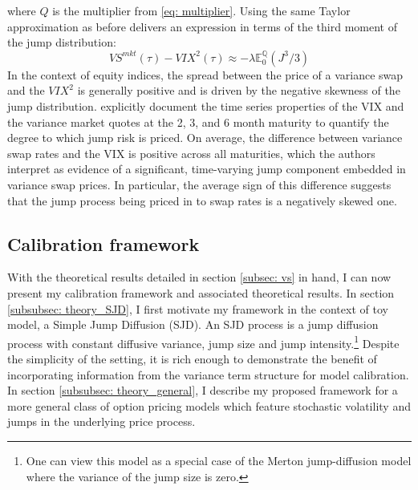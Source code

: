 \documentclass[12pt]{article}
\begin{document}
where $Q$ is the multiplier from \eqref{eq: multiplier}. Using the same Taylor approximation as before delivers an expression in terms of the third moment of the jump distribution: 
\begin{equation*}
     VS^{mkt}(\tau) - VIX^2(\tau) \approx -\lambda\mathbb{E}_0^\mathbb{Q}\left(J^3/3\right)
\end{equation*}
In the context of equity indices, the spread between the price of a variance swap and the $VIX^2$ is generally positive and is driven by the negative skewness of the jump distribution. \cite{ait2020term} explicitly document the time series properties of the VIX and the variance market quotes at the 2, 3, and 6 month maturity to quantify the degree to which jump risk is priced. On average, the difference between variance swap rates and the VIX is positive across all maturities, which the authors interpret as evidence of a significant, time-varying jump component embedded in variance swap prices. In particular, the average sign of this difference suggests that the jump process being priced in to swap rates is a negatively skewed one.

\subsection{Calibration framework}\label{subsec: model_calibration} 
With the theoretical results detailed in section \ref{subsec: vs} in hand, I can now present my calibration framework and associated theoretical results. In section \ref{subsubsec: theory_SJD}, I first motivate my framework in the context of toy model, a Simple Jump Diffusion (SJD). An SJD process is a jump diffusion process with constant diffusive variance, jump size and jump intensity.\footnote{One can view this model as a special case of the Merton jump-diffusion model where the variance of the jump size is zero.} Despite the simplicity of the setting, it is rich enough to demonstrate the benefit of incorporating information from the variance term structure for model calibration. In section \ref{subsubsec: theory_general}, I describe my proposed framework for a more general class of option pricing models which feature stochastic volatility and jumps in the underlying price process.
\end{document}
